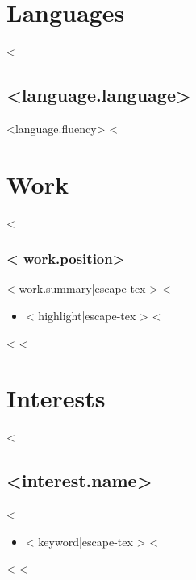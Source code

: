 \documentclass{resume}
\begin{document}
\section{Languages}
\begin{multicols}{2}
  <%
  \subsection{<{language.language}>}
  <{language.fluency}>
  <%
\end{multicols}
\section{Work}
<%
\subsubsection{<{ work.position}>}
<{ work.summary|escape-tex }>
<%
\begin{itemize}
<%
  \item <{ highlight|escape-tex }>
<%
\end{itemize}
<%
<%
\section{Interests}
<%
\subsection{<{interest.name}>}
<%
\begin{itemize}
  \setlength\itemsep{0.1em}
  <%
\item <{ keyword|escape-tex }>
  <%
\end{itemize}
\vspace{0.5em}
<%
<%
\end{document}
